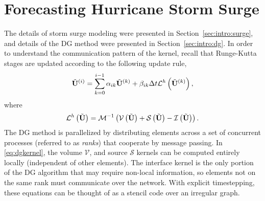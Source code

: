 \section{Forecasting Hurricane Storm Surge}
\label{sec:dgswem}

The details of storm surge modeling were presented in Section~\ref{sec:intro:surge}, and details of the DG method were presented in Section~\ref{sec:intro:dg}. 
In order to understand the communication pattern of the kernel, recall that Runge-Kutta stages are updated according to the following update rule,
\begin{equation*}
\tilde{{\bf U}}^{(i)} = \sum_{k=0}^{i-1} \alpha_{ik} \tilde{{\bf U}}^{(k)} + \beta_{ik} \Delta t \mathcal{L}^h\left(\tilde{{\bf U}}^{(k)}\right),
\end{equation*}
where
\begin{equation}
\mathcal{L}^h \left(\tilde{{\bf U}} \right) = \mathcal{M}^{-1}\left( \mathcal{V}\left(\tilde{{\bf U}}\right) + \mathcal{S}\left(\tilde{{\bf U}}\right) - \mathcal{I}\left(\tilde{{\bf U}}\right) \right).
\label{eq:dgkernel}
\end{equation}
The DG method is parallelized by distributing elements across a set of concurrent processes (referred to as {\em ranks}) that cooperate by message passing.
In \eqref{eq:dgkernel}, the volume $\mathcal{V}$, and source $\mathcal{S}$ kernels can be computed entirely locally (independent of other elements).
The interface kernel is the only portion of the DG algorithm that may require non-local information, so elements not on the same rank must communicate over the network.
With explicit timestepping, these equations can be thought of as a stencil code over an irregular graph.



